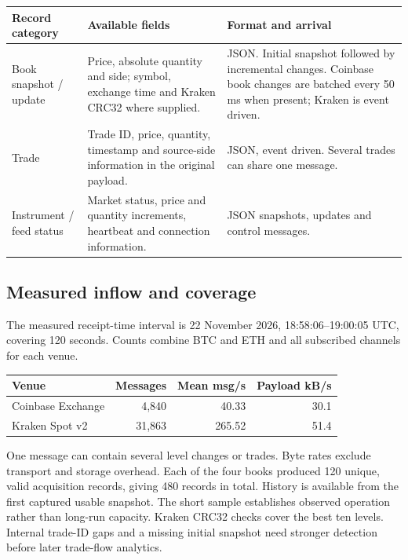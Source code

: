 \documentclass[11pt,a4paper]{article}
\begin{document}
\begin{table}[h!]
\centering\small
\begin{tabularx}{\textwidth}{@{}L{27mm}YY@{}}
\toprule
\textbf{Record category} & \textbf{Available fields} & \textbf{Format and arrival}\\
\midrule
Book snapshot / update & Price, absolute quantity and side; symbol, exchange time and Kraken CRC32 where supplied. & JSON. Initial snapshot followed by incremental changes. Coinbase book changes are batched every 50 ms when present; Kraken is event driven.\\
Trade & Trade ID, price, quantity, timestamp and source-side information in the original payload. & JSON, event driven. Several trades can share one message.\\
Instrument / feed status & Market status, price and quantity increments, heartbeat and connection information. & JSON snapshots, updates and control messages.\\
\bottomrule
\end{tabularx}
\end{table}

\subsection{Measured inflow and coverage}
The measured receipt-time interval is 22 November 2026, 18:58:06--19:00:05 UTC, covering 120 seconds. Counts combine BTC and ETH and all subscribed channels for each venue.

\begin{table}[h!]
\centering\small
\begin{tabularx}{\textwidth}{@{}Yrrr@{}}
\toprule
\textbf{Venue} & \textbf{Messages} & \textbf{Mean msg/s} & \textbf{Payload kB/s}\\
\midrule
Coinbase Exchange & 4,840 & 40.33 & 30.1\\
Kraken Spot v2 & 31,863 & 265.52 & 51.4\\
\bottomrule
\end{tabularx}
\end{table}

One message can contain several level changes or trades. Byte rates exclude transport and storage overhead. Each of the four books produced 120 unique, valid acquisition records, giving 480 records in total. History is available from the first captured usable snapshot. The short sample establishes observed operation rather than long-run capacity. Kraken CRC32 checks cover the best ten levels. Internal trade-ID gaps and a missing initial snapshot need stronger detection before later trade-flow analytics.
\end{document}
